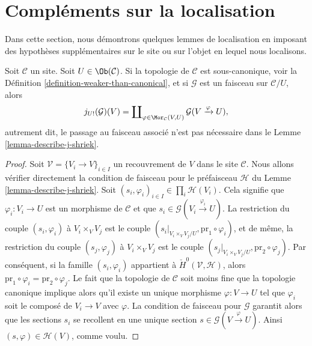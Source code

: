 \section{Compléments sur la localisation}
\label{section-more-localize}

\noindent
Dans cette section, nous démontrons quelques lemmes de localisation en
imposant des hypothèses supplémentaires sur le site ou sur l’objet
en lequel nous localisons.

\begin{lemma}
\label{lemma-describe-j-shriek-good-site}
Soit $\mathcal{C}$ un site.
Soit $U \in \Ob(\mathcal{C})$.
Si la topologie de $\mathcal{C}$ est sous-canonique, voir la
Définition \ref{definition-weaker-than-canonical},
et si $\mathcal{G}$ est un faisceau sur $\mathcal{C}/U$, alors
$$
j_{U!}(\mathcal{G})(V)
=
\coprod\nolimits_{\varphi \in \Mor_\mathcal{C}(V, U)}
\mathcal{G}(V \xrightarrow{\varphi} U),
$$
autrement dit, le passage au faisceau associé n’est pas nécessaire dans le
Lemme \ref{lemma-describe-j-shriek}.
\end{lemma}

\begin{proof}
Soit $\mathcal{V} = \{V_i \to V\}_{i \in I}$ un recouvrement de $V$
dans le site $\mathcal{C}$.
Nous allons vérifier directement la condition de faisceau pour le préfaisceau $\mathcal{H}$
du Lemme \ref{lemma-describe-j-shriek}.
Soit $(s_i, \varphi_i)_{i \in I} \in \prod_i \mathcal{H}(V_i)$.
Cela signifie que $\varphi_i : V_i \to U$ est un morphisme de $\mathcal{C}$ et que
$s_i \in \mathcal{G}(V_i \xrightarrow{\varphi_i} U)$.
La restriction du couple $(s_i, \varphi_i)$ à
$V_i \times_V V_j$ est le couple
$(s_i|_{V_i \times_V V_j/U}, \text{pr}_1 \circ \varphi_i)$, et
de même, la restriction du couple $(s_j, \varphi_j)$ à
$V_i \times_V V_j$ est le couple
$(s_j|_{V_i \times_V V_j/U}, \text{pr}_2 \circ \varphi_j)$.
Par conséquent, si la famille $(s_i, \varphi_i)$ appartient à
$\check{H}^0(\mathcal{V}, \mathcal{H})$, alors
$\text{pr}_1 \circ \varphi_i = \text{pr}_2 \circ \varphi_j$.
Le fait que la topologie de $\mathcal{C}$ soit moins fine que la topologie canonique
implique alors qu’il existe un unique morphisme
$\varphi : V \to U$ tel que $\varphi_i$ soit le composé
de $V_i \to V$ avec $\varphi$. La condition de faisceau pour
$\mathcal{G}$ garantit alors que les sections $s_i$ se recollent en une unique
section $s \in \mathcal{G}(V \xrightarrow{\varphi} U)$.
Ainsi $(s, \varphi) \in \mathcal{H}(V)$, comme voulu.
\end{proof}

